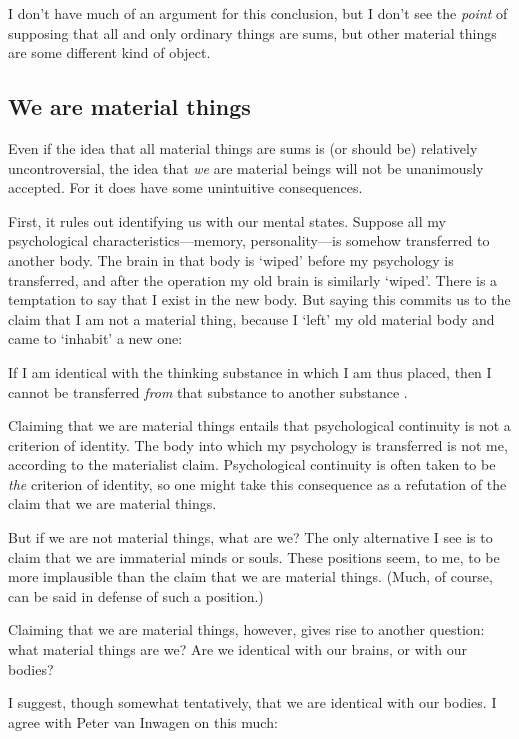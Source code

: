 \documentclass[11pt]{article}
\newenvironment{squote}{%
\begin{spacing}{1}
\begin{list}{}{%
\setlength{\labelwidth}{0pt}%
\rightmargin\leftmargin%
}
\item\relax
}{%
\end{list}%
\end{spacing}
}
\begin{document}
\begin{spacing}{1.5}
I don't have much of an argument for this conclusion, but I don't see
the {\em point} of supposing that all and only ordinary things are
sums, but other material things are some different kind of object.

\subsection{We are material things}
\label{material-beings}
Even if the idea that all material things are sums is (or should be)
relatively uncontroversial, the idea that {\em we} are material beings
will not be unanimously accepted.  For it does have some unintuitive
consequences.  

First, it rules out identifying us with our mental states.  Suppose
all my psychological characteristics---memory, personality---is
somehow transferred to another body.  The brain in that body is
`wiped' before my psychology is transferred, and after the operation
my old brain is similarly `wiped'.  There is a temptation to say that
I exist in the new body.  But saying this commits us to the claim that
I am not a material thing, because I `left' my old material body and
came to `inhabit' a new one:

\begin{squote}
 If I am identical with the thinking substance in which I am thus
 placed, then I cannot be transferred {\em from} that substance to
 another substance \citep[107]{chisholm1979}.
\end{squote}

Claiming that we are material things entails that psychological
continuity is not a criterion of identity.  The body into which my
psychology is transferred is not me, according to the materialist
claim.  Psychological continuity is often taken to be {\em the}
criterion of identity, so one might take this consequence as a
refutation of the claim that we are material things.

But if we are not material things, what are we?  The only alternative
I see is to claim that we are immaterial minds or souls.  These
positions seem, to me, to be more implausible than the claim that we
are material things.  (Much, of course, can be said in defense of such
a position.)

Claiming that we are material things, however, gives rise to another
question: what material things are we?  Are we identical with our
brains, or with our bodies?

I suggest, though somewhat tentatively, that we are identical with our
bodies.  I agree with Peter van Inwagen on this much:


\end{spacing}
\end{document}
